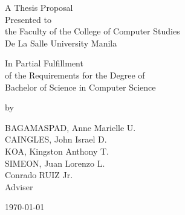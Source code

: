\begin{titlepage}
\centering



\vspace{1.75cm}
A Thesis Proposal\\
Presented to\\
the Faculty of the College of Computer Studies\\
De La Salle University Manila

\vspace{1.75cm}
In Partial Fulfillment\\
of the Requirements for the Degree of\\
Bachelor of  Science in Computer Science

\vspace{1.75cm}
by\\
\vspace{1cm}

BAGAMASPAD, Anne Marielle U. \\
CAINGLES, John Israel D. \\
KOA, Kingston Anthony T. \\
SIMEON, Juan Lorenzo L. \\

\vspace{1.75cm}
Conrado RUIZ Jr. \\
Adviser

\vspace{1.75cm}
\today
\end{titlepage}
